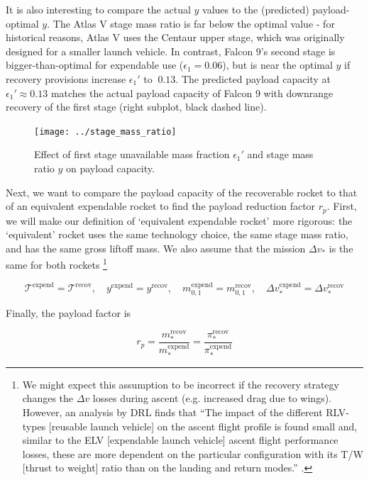 \documentclass[conf]{new-aiaa}
\begin{document}
It is also interesting to compare the actual $y$ values to the (predicted) payload-optimal $y$. The Atlas V stage mass ratio is far below the optimal value - for historical reasons, Atlas V uses the Centaur upper stage, which was originally designed for a smaller launch vehicle. In contrast, Falcon 9's second stage is bigger-than-optimal for expendable use ($\epsilon_1=0.06$), but is near the optimal $y$ if recovery provisions increase $\epsilon_1'$ to $~0.13$. The predicted payload capacity at $\epsilon_1' \approx 0.13$ matches the actual payload capacity of Falcon 9 with downrange recovery of the first stage (right subplot, black dashed line).

\begin{figure}[hbt!]
	\centering
	\texttt{[image: ../stage\_mass\_ratio]}
	\caption{\label{fig:stage_mass_ratio} Effect of first stage unavailable mass fraction $\epsilon_1'$ and stage mass ratio $y$ on payload capacity.}
\end{figure}

Next, we want to compare the payload capacity of the recoverable rocket to that of an equivalent expendable rocket to find the payload reduction factor $r_p$. First, we will make our definition of `equivalent expendable rocket' more rigorous: the `equivalent' rocket uses the same technology choice, the same stage mass ratio, and has the same gross liftoff mass. We also assume that the mission $\Delta v_*$ is the same for both rockets \footnote{We might expect this assumption to be incorrect if the recovery strategy changes the $\Delta v$ losses during ascent (e.g. increased drag due to wings). However, an analysis by DRL finds that ``The impact of the different RLV-types [reusable launch vehicle] on the ascent flight profile is found small and, similar to the ELV [expendable launch vehicle] ascent flight performance losses, these are more dependent on the particular configuration with its T/W [thrust to weight] ratio than on the landing and return modes.'' \cite{Stappert2017}.}

\begin{equation}
\mathcal{T}^{\mathrm{expend}} = \mathcal{T}^{\mathrm{recov}}, \quad y^{\mathrm{expend}} = y^{\mathrm{recov}}, \quad m_{0,1}^{\mathrm{expend}} = m_{0,1}^{\mathrm{recov}}, \quad \Delta v_*^{\mathrm{expend}} = \Delta v_*^{\mathrm{recov}}
\end{equation}

Finally, the payload factor is

\begin{equation}
r_p = \frac{m_*^{\mathrm{recov}}}{m_*^{\mathrm{expend}}} = \frac{\pi_*^{\mathrm{recov}}}{\pi_*^{\mathrm{expend}}}
\end{equation}
\end{document}
